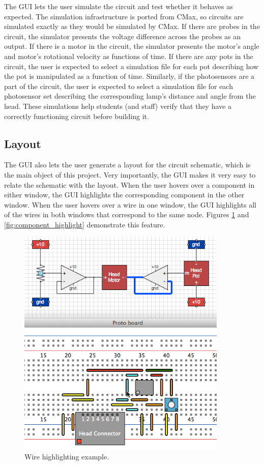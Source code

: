 The GUI lets the user simulate the circuit and test whether it behaves as
expected. The simulation infrastructure is ported from CMax, so circuits
are simulated exactly as they would be simulated by CMax.
If there are probes in the
circuit, the simulator presents the voltage difference across the probes as an
output. If there is a motor in the circuit, the simulator presents the motor's
angle and motor's rotational velocity as functions of time. If there are any
pots in the circuit, the user is expected to select a simulation file for each
pot describing how the pot is manipulated as a function of time. Similarly,
if the photosensors are a part of the circuit, the user is expected to select
a simulation file for each photosensor set describing the corresponding lamp's
distance and
angle from the head. These simulations help students (and staff) verify that
they have a correctly functioning circuit before building it.

\subsection{Layout}

The GUI also lets the user generate a layout for the circuit schematic, which is
the main object of this project. Very importantly, the GUI makes it very easy to
relate the schematic with the layout. When the user hovers over a component in
either window, the GUI highlights the corresponding component in the other
window. When the user hovers over a wire in one window, the GUI highlights all
of the wires in both windows that correspond to the same node. Figures
\ref{fig:wire_highlight} and \ref{fig:component_highlight} demonstrate this
feature.

\begin{figure}
\begin{center}
\includegraphics[width=10cm]{Images/gui_wire_highlight.png}
\caption[GUI wire highlighting example]{Wire highlighting example.}
\label{fig:wire_highlight}
\end{center}
\end{figure}

